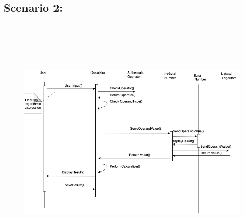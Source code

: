 \documentclass[12pt]{report}
\begin{document}
\vspace{\baselineskip}

\vspace{\baselineskip}

\vspace{\baselineskip}
\subsection*{Scenario 2:}

\vspace{\baselineskip}



\begin{figure}[H]
	\begin{Center}
		\includegraphics[width=7.22in,height=4.81in]{./image9.png}
	\end{Center}
\end{figure}



\par


\vspace{\baselineskip}

\vspace{\baselineskip}
\end{document}

